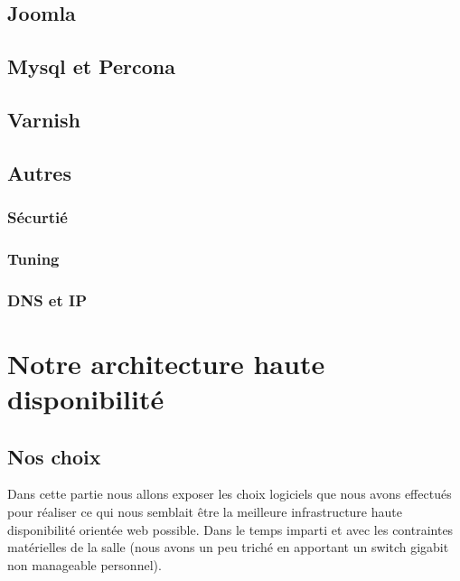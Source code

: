 \documentclass[a4paper,10pt,one side,titlepage]{report}
\begin{document}
\chapter{Joomla}


\chapter{Mysql et Percona}


\chapter{Varnish}


%
%
%
\chapter{Autres}
\section{Sécurtié}


\section{Tuning}


\section{DNS et IP}





\part{Notre architecture haute disponibilité}
\chapter{Nos choix}
Dans cette partie nous allons exposer les choix logiciels que nous avons effectués
pour réaliser ce qui nous semblait être la meilleure infrastructure haute disponibilité
orientée web possible. Dans le temps imparti et avec les contraintes matérielles de
la salle (nous avons un peu triché en apportant un switch gigabit non manageable
personnel).
\end{document}
